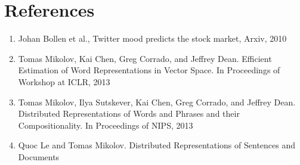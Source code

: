 \documentclass{sig-alternate-05-2015}
\begin{document}
	
\section{References}
\begin{enumerate}
	\item Johan Bollen et al., Twitter mood predicts the stock market, Arxiv, 2010
	\item Tomas Mikolov, Kai Chen, Greg Corrado, and Jeffrey Dean. Efficient Estimation of Word Representations in Vector Space. In Proceedings of Workshop at ICLR, 2013
	\item Tomas Mikolov, Ilya Sutskever, Kai Chen, Greg Corrado, and Jeffrey Dean. Distributed Representations of Words and Phrases and their Compositionality. In Proceedings of NIPS, 2013
	\item Quoc Le and Tomas Mikolov. Distributed Representations of Sentences and Documents
\end{enumerate}




	
	
	
\end{document}
